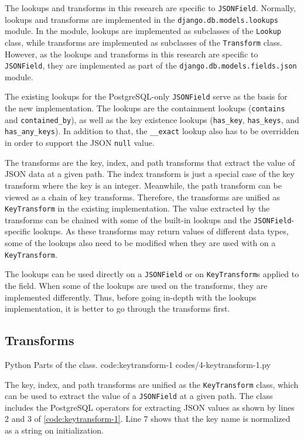 The lookups and transforms in this research are specific to \verb|JSONField|.
Normally, lookups and transforms are implemented in the
\verb|django.db.models.lookups| module. In the module, lookups are implemented
as subclasses of the \verb|Lookup| class, while transforms are implemented as
subclasses of the \verb|Transform| class. However, as the lookups and
transforms in this research are specific to \verb|JSONField|, they are
implemented as part of the \verb|django.db.models.fields.json| module.

The existing lookups for the PostgreSQL-only \verb|JSONField| serve as the
basis for the new implementation. The lookups are the containment lookups
(\verb|contains| and \verb|contained_by|), as well as the key existence
lookups (\verb|has_key|, \verb|has_keys|, and \verb|has_any_keys|). In addition
to that, the \verb|__exact| lookup also has to be overridden in order to
support the JSON \verb|null| value.

The transforms are the key, index, and path transforms that extract the value
of JSON data at a given path. The index transform is just a special case of
the key transform where the key is an integer. Meanwhile, the path transform
can be viewed as a chain of key transforms. Therefore, the transforms are
unified as \verb|KeyTransform| in the existing implementation. The value
extracted by the transforms can be chained with some of the built-in lookups
and the \verb|JSONField|-specific lookups. As these transforms may return
values of different data types, some of the lookups also need to be modified
when they are used with on a \verb|KeyTransform|.

The lookups can be used directly on a \verb|JSONField| or on
\verb|KeyTransform|s applied to the field. When some of the lookups are used on
the transforms, they are implemented differently. Thus, before going in-depth
with the lookups implementation, it is better to go through the transforms
first.

\subsection{ Transforms}

\listing
{Python}
{Parts of the  class.}
{code:keytransform-1}
{codes/4-keytransform-1.py}

The key, index, and path
transforms are unified as the \verb|KeyTransform| class, which can be used to
extract the value of a \verb|JSONField| at a given path. The class includes the
{PostgreSQL} operators for extracting JSON values as shown by lines 2 and 3
of \autoref{code:keytransform-1}. Line 7 shows that the key name is normalized
as a string on initialization.

